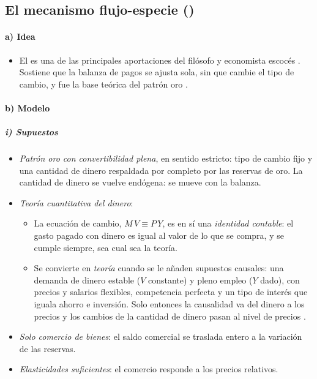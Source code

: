 \documentclass[11pt]{article}
\begin{document}
\subsection{El mecanismo flujo-especie ()}\label{sec:flujo-especie}

\paragraph{a) Idea}

\begin{itemize}
\item El  es una de las principales aportaciones del filósofo y economista escocés \nocite{Hume1752Balance} . Sostiene que la balanza de pagos se ajusta sola, sin que cambie el tipo de cambio, y fue la base teórica del patrón oro .
\end{itemize}

\paragraph{b) Modelo}

\subparagraph{i) Supuestos}

\begin{itemize}
\item \emph{Patrón oro con convertibilidad plena}, en sentido estricto: tipo de cambio fijo y una cantidad de dinero respaldada por completo por las reservas de oro. La cantidad de dinero se vuelve endógena: se mueve con la balanza.
\item \emph{Teoría cuantitativa del dinero}:
  \begin{itemize}
  \item La ecuación de cambio, $M\,V\equiv P\,Y$, es en sí una \emph{identidad contable}: el gasto pagado con dinero es igual al valor de lo que se compra, y se cumple siempre, sea cual sea la teoría.
  \item Se convierte en \emph{teoría} cuando se le añaden supuestos causales: una demanda de dinero estable ($V$ constante) y pleno empleo ($Y$ dado), con precios y salarios flexibles, competencia perfecta y un tipo de interés que iguala ahorro e inversión. Solo entonces la causalidad va del dinero a los precios y los cambios de la cantidad de dinero pasan al nivel de precios .
  \end{itemize}
\item \emph{Solo comercio de bienes}: el saldo comercial se traslada entero a la variación de las reservas.
\item \emph{Elasticidades suficientes}: el comercio responde a los precios relativos.
\end{itemize}
\end{document}
